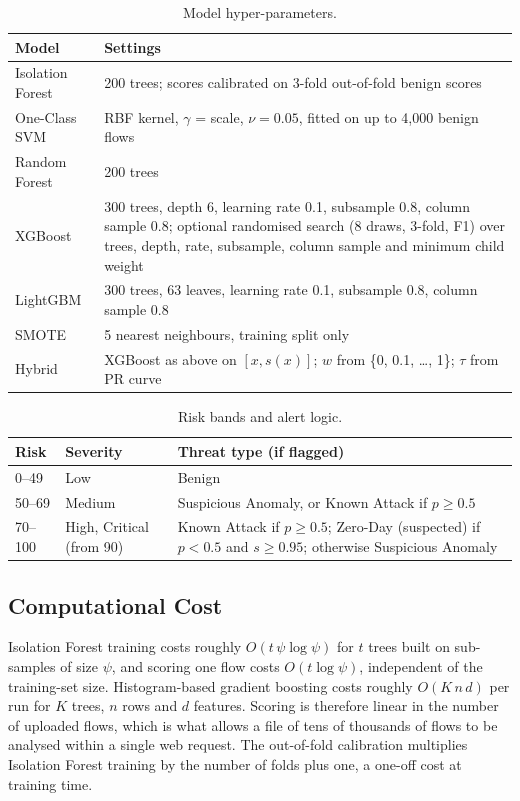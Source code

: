 \documentclass[conference]{IEEEtran}
\begin{document}
\begin{table}[!htb]
\caption{Model hyper-parameters.}
\label{tab:hp}
\centering\footnotesize
\begin{tabular}{@{}p{1.75cm}p{5.6cm}@{}}
\hline
Model & Settings \\
\hline
Isolation Forest & 200 trees; scores calibrated on 3-fold out-of-fold benign scores \\
One-Class SVM & RBF kernel, $\gamma$ = scale, $\nu=0.05$, fitted on up to 4,000 benign flows \\
Random Forest & 200 trees \\
XGBoost & 300 trees, depth 6, learning rate 0.1, subsample 0.8, column sample 0.8; optional randomised search (8 draws, 3-fold, F1) over trees, depth, rate, subsample, column sample and minimum child weight \\
LightGBM & 300 trees, 63 leaves, learning rate 0.1, subsample 0.8, column sample 0.8 \\
SMOTE & 5 nearest neighbours, training split only \\
Hybrid & XGBoost as above on $[x,s(x)]$; $w$ from \{0, 0.1, \dots, 1\}; $\tau$ from PR curve \\
\hline
\end{tabular}
\end{table}

\begin{table}[!htb]
\caption{Risk bands and alert logic.}
\label{tab:risk}
\centering\footnotesize
\begin{tabular}{@{}p{0.9cm}p{1.2cm}p{5.2cm}@{}}
\hline
Risk & Severity & Threat type (if flagged) \\
\hline
0--49 & Low & Benign \\
50--69 & Medium & Suspicious Anomaly, or Known Attack if $p\ge0.5$ \\
70--100 & High, Critical (from 90) & Known Attack if $p\ge0.5$; Zero-Day (suspected) if $p<0.5$ and $s\ge0.95$; otherwise Suspicious Anomaly \\
\hline
\end{tabular}
\end{table}

\subsection{Computational Cost}
Isolation Forest training costs roughly $O(t\,\psi\log\psi)$ for $t$ trees built on sub-samples of size $\psi$, and scoring one flow costs $O(t\log\psi)$, independent of the training-set size. Histogram-based gradient boosting costs roughly $O(K\,n\,d)$ per run for $K$ trees, $n$ rows and $d$ features. Scoring is therefore linear in the number of uploaded flows, which is what allows a file of tens of thousands of flows to be analysed within a single web request. The out-of-fold calibration multiplies Isolation Forest training by the number of folds plus one, a one-off cost at training time.
\end{document}
